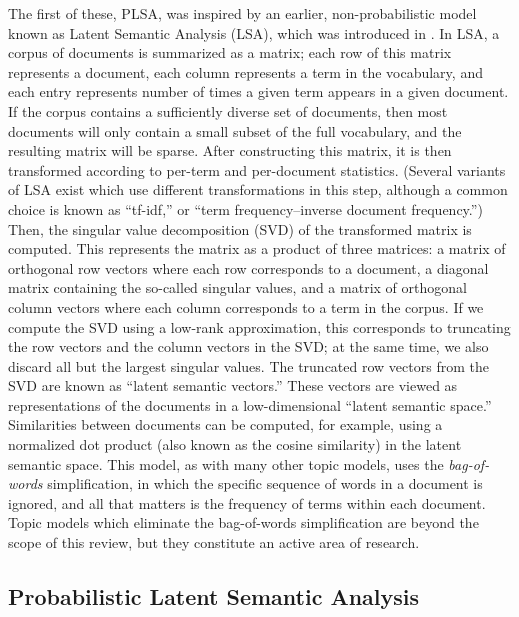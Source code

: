 \documentclass{article}
\begin{document}
The first of these, PLSA, was inspired by an earlier, non-probabilistic model known as Latent Semantic Analysis (LSA), which was introduced in \cite{deerwester1990lsa}.
In LSA, a corpus of documents is summarized as a matrix; each row of this matrix represents a document, each column represents a term in the vocabulary, and each entry represents number of times a given term appears in a given document.
If the corpus contains a sufficiently diverse set of documents, then most documents will only contain a small subset of the full vocabulary, and the resulting matrix will be sparse.
After constructing this matrix, it is then transformed according to per-term and per-document statistics.
(Several variants of LSA exist which use different transformations in this step, although a common choice is known as ``tf-idf,'' or ``term frequency--inverse document frequency.'')
Then, the singular value decomposition (SVD) of the transformed matrix is computed.
This represents the matrix as a product of three matrices: a matrix of orthogonal row vectors where each row corresponds to a document, a diagonal matrix containing the so-called singular values, and a matrix of orthogonal column vectors where each column corresponds to a term in the corpus.
If we compute the SVD using a low-rank approximation, this corresponds to truncating the row vectors and the column vectors in the SVD; at the same time, we also discard all but the largest singular values.
The truncated row vectors from the SVD are known as ``latent semantic vectors.''
These vectors are viewed as representations of the documents in a low-dimensional ``latent semantic space.''
Similarities between documents can be computed, for example, using a normalized dot product (also known as the cosine similarity) in the latent semantic space.
This model, as with many other topic models, uses the \emph{bag-of-words} simplification, in which the specific sequence of words in a document is ignored, and all that matters is the frequency of terms within each document.
Topic models which eliminate the bag-of-words simplification are beyond the scope of this review, but they constitute an active area of research.

\subsection{Probabilistic Latent Semantic Analysis}
\end{document}

